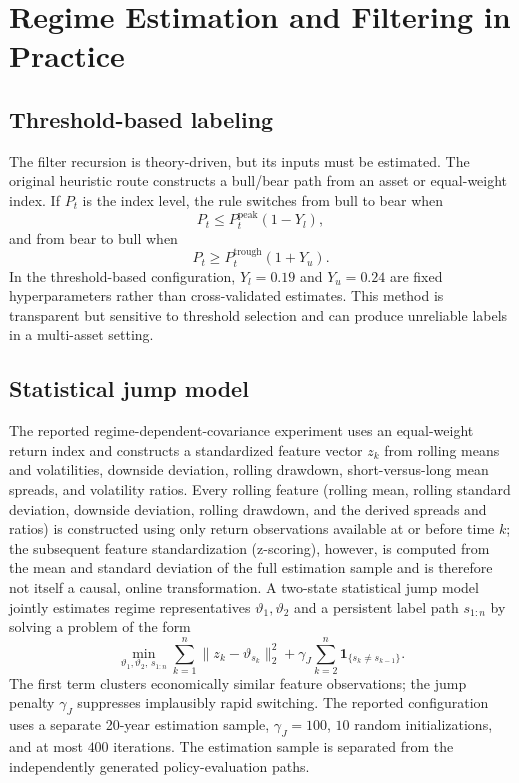 \documentclass[a4paper,10pt]{article}
\begin{document}
\section{Regime Estimation and Filtering in Practice}

\subsection{Threshold-based labeling}

The filter recursion is theory-driven, but its inputs must be estimated. The original heuristic route constructs a bull/bear path from an asset or equal-weight index. If $P_t$ is the index level, the rule switches from bull to bear when
\begin{equation}
P_t\le P_t^{\mathrm{peak}}(1-Y_l),
\end{equation}
and from bear to bull when
\begin{equation}
P_t\ge P_t^{\mathrm{trough}}(1+Y_u).
\end{equation}
In the threshold-based configuration, $Y_l=0.19$ and $Y_u=0.24$ are fixed hyperparameters rather than cross-validated estimates. This method is transparent but sensitive to threshold selection and can produce unreliable labels in a multi-asset setting.

\subsection{Statistical jump model}

The reported regime-dependent-covariance experiment uses an equal-weight return index and constructs a standardized feature vector $z_k$ from rolling means and volatilities, downside deviation, rolling drawdown, short-versus-long mean spreads, and volatility ratios. Every rolling feature (rolling mean, rolling standard deviation, downside deviation, rolling drawdown, and the derived spreads and ratios) is constructed using only return observations available at or before time $k$; the subsequent feature standardization (z-scoring), however, is computed from the mean and standard deviation of the full estimation sample and is therefore not itself a causal, online transformation. A two-state statistical jump model jointly estimates regime representatives $\vartheta_1,\vartheta_2$ and a persistent label path $s_{1:n}$ by solving a problem of the form
\begin{equation}
\min_{\vartheta_1,\vartheta_2,\,s_{1:n}}
\sum_{k=1}^n\|z_k-\vartheta_{s_k}\|_2^2
+\gamma_J\sum_{k=2}^n\bm{1}_{\{s_k\ne s_{k-1}\}}.
\label{eq:sjm_objective}
\end{equation}
The first term clusters economically similar feature observations; the jump penalty $\gamma_J$ suppresses implausibly rapid switching. The reported configuration uses a separate 20-year estimation sample, $\gamma_J=100$, $10$ random initializations, and at most $400$ iterations. The estimation sample is separated from the independently generated policy-evaluation paths.
\end{document}
